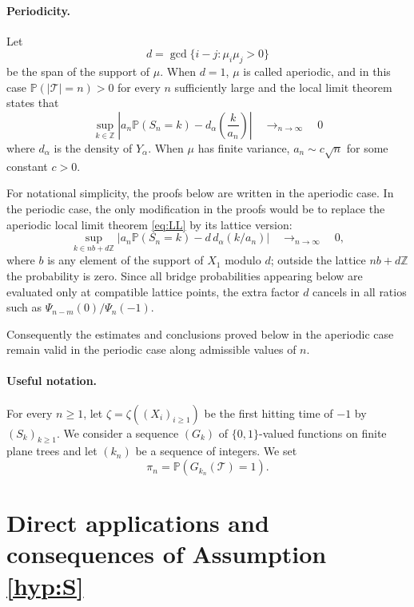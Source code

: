 \documentclass[a4paper,11pt]{article}
\DeclareRobustCommand{\P}{\mathbb{P}}
\DeclareRobustCommand{\1}{\mathbf{1}}
\newcommand{\Z}{\mathbb{Z}}
\renewcommand\Pr[1]{\mathbb{P}\left(#1\right)}
\begin{document}
\paragraph{Periodicity.}
Let
\[
d=\gcd\{i-j:\mu_i\mu_j>0\}
\]
be the span of the support of $\mu$.  When $d=1$, $\mu$ is called aperiodic, and in this case $\mathbb P(|\mathcal T|=n)>0$ for every $n$ sufficiently large and the local limit theorem  \cite[Theorem 4.2.1]{IL71} states that
\begin{equation}
\label{eq:LL}\sup_{k \in \Z} \left| a_{n} \Pr{S_{n}=k}- d_{\alpha} \left(  \frac{k}{a_{n}} \right)  \right|  \quad \mathop{\longrightarrow}_{n \rightarrow \infty} \quad 0
\end{equation} 
where $d_{\alpha}$ is the density of $Y_{\alpha}$. When $\mu$ has finite variance, $a_{n} \sim c \sqrt{n}$ for some constant $c>0$.


For notational simplicity, the proofs below are written in the aperiodic case. In the periodic case, the only modification in the proofs would be to replace the aperiodic local limit theorem
\eqref{eq:LL}  by its lattice version:
\[
\sup_{k\in n b+d\mathbb Z}
\left|
a_n\mathbb P(S_n=k)-d\,d_\alpha(k/a_n)
\right|
 \quad \mathop{\longrightarrow}_{n \rightarrow \infty} \quad 0,
\]
where $b$ is any element of the support of $X_1$ modulo $d$; outside the
lattice $n b+d\mathbb Z$ the probability is zero. Since all bridge
probabilities appearing below are evaluated only at compatible lattice points,
the extra factor $d$ cancels in all ratios such as ${\Psi_{n-m}(0)}/{\Psi_n(-1)}$.

Consequently the estimates and conclusions proved below in the aperiodic case
remain valid in the periodic case along admissible values of $n$.





\paragraph{Useful notation.} For every $n \geq 1$,  let $\zeta=\zeta((X_{i})_{i \geq 1})$ be  the first hitting time of $-1$ by $(S_{k})_{k \geq 1}$. We consider a sequence $(G_k)$  of $\{0,1\}$-valued functions on finite plane trees and let $(k_{n})$ be a sequence of integers. We set 
$$\pi_n=\P(G_{k_n}(\mathcal T)=1).$$


\section{Direct applications and consequences of Assumption \ref{hyp:S}}
\label{sec:applications}
 
\end{document}
